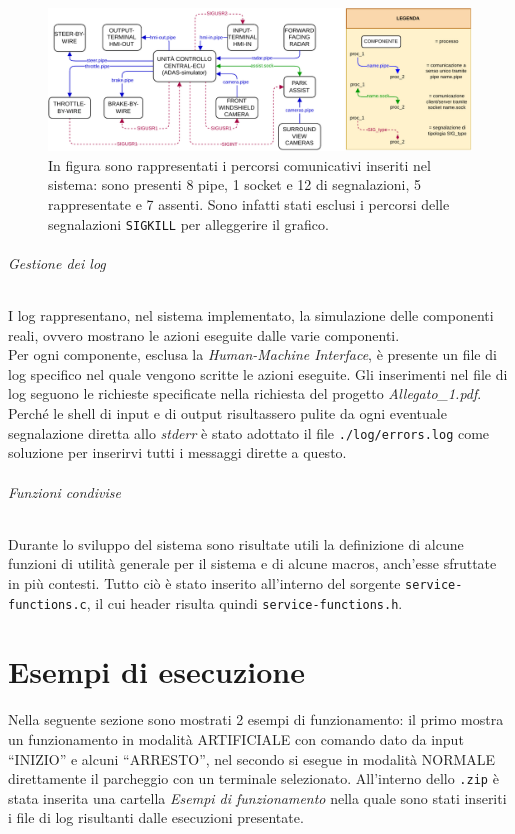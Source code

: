 \documentclass[11pt, openany]{article}
\theoremstyle{definition}
\theoremstyle{plain}
\theoremstyle{remark}
\begin{document}
	\begin{figure}[t]
		\includegraphics[scale=0.9, center]{./include/SO_Progetto_Diagrammi-Comunicazione.pdf}
		\caption{In figura sono rappresentati i percorsi comunicativi inseriti nel sistema: sono presenti 8 pipe, 1 socket e 12 di segnalazioni, 5 rappresentate e 7 assenti. Sono infatti stati esclusi i percorsi delle segnalazioni \texttt{SIGKILL} per alleggerire il grafico.}
		\label{fig:comunicazione}
	\end{figure}
	\normalsize
	\paragraph{Gestione dei log}
	I log rappresentano, nel sistema implementato, la simulazione delle componenti reali, ovvero mostrano le azioni eseguite dalle varie componenti.\\
	Per ogni componente, esclusa la \textit{Human-Machine Interface}, è presente un file di log specifico nel quale vengono scritte le azioni eseguite.
	Gli inserimenti nel file di log seguono le richieste specificate nella richiesta del progetto \textit{Allegato\_1.pdf}.
	Perché le shell di input e di output risultassero pulite da ogni eventuale segnalazione diretta allo \textit{stderr} è stato adottato il file \texttt{./log/errors.log} come soluzione per inserirvi tutti i messaggi dirette a questo.
	
	\paragraph{Funzioni condivise}
	Durante lo sviluppo del sistema sono risultate utili la definizione di alcune funzioni di utilità generale per il sistema e di alcune macros, anch'esse sfruttate in più contesti. Tutto ciò è stato inserito all'interno del sorgente \texttt{service-functions.c}, il cui header risulta quindi \texttt{service-functions.h}.
	
	\part{Esempi di esecuzione}
	Nella seguente sezione sono mostrati 2 esempi di funzionamento: il primo mostra un funzionamento in modalità ARTIFICIALE con comando dato da input ``INIZIO'' e alcuni ``ARRESTO'', nel secondo si esegue in modalità NORMALE direttamente il parcheggio con un terminale selezionato. All'interno dello \texttt{.zip} è stata  inserita una cartella \textit{Esempi di funzionamento} nella quale sono stati inseriti i file di log risultanti dalle esecuzioni presentate.
\end{document}
